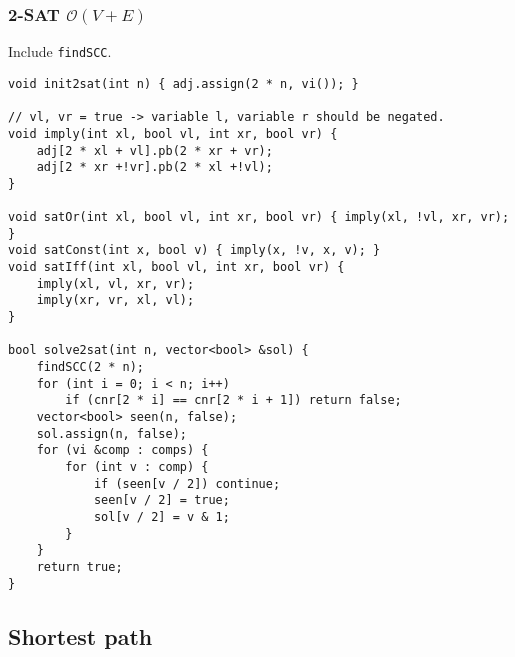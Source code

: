 \documentclass{article}
\begin{document}
\subsubsection{2-SAT $\mathcal{O}(V+E)$}

Include \texttt{findSCC}.

\begin{lstlisting}
void init2sat(int n) { adj.assign(2 * n, vi()); }

// vl, vr = true -> variable l, variable r should be negated.
void imply(int xl, bool vl, int xr, bool vr) {
	adj[2 * xl + vl].pb(2 * xr + vr);
	adj[2 * xr +!vr].pb(2 * xl +!vl);
}

void satOr(int xl, bool vl, int xr, bool vr) { imply(xl, !vl, xr, vr); }
void satConst(int x, bool v) { imply(x, !v, x, v); }
void satIff(int xl, bool vl, int xr, bool vr) {
	imply(xl, vl, xr, vr);
	imply(xr, vr, xl, vl);
}

bool solve2sat(int n, vector<bool> &sol) {
	findSCC(2 * n);
	for (int i = 0; i < n; i++)
		if (cnr[2 * i] == cnr[2 * i + 1]) return false;
	vector<bool> seen(n, false);
	sol.assign(n, false);
	for (vi &comp : comps) {
		for (int v : comp) {
			if (seen[v / 2]) continue;
			seen[v / 2] = true;
			sol[v / 2] = v & 1;
		}
	}
	return true;
}
\end{lstlisting}

\begin{comment}
\subsection{Cycle Detection $\mathcal{O}(V + E)$}

\begin{lstlisting}
vvi adj; // assumes bidirected graph, adjust accordingly
vector<bool> vis(MAXN, false);
vi par(MAXN, -1);

bool cycle_detection() {
	stack<int> s;
	s.push(0);
	vis[0] = true;
	while(!s.empty()) {
		int cur = s.top();
		s.pop();
		for(int i : adj[cur]) {
			if(vis[i] && par[cur] != i) return true;
			s.push(i);
			par[i] = cur;
			vis[i] = true;
		}
	}
	return false;
} 
\end{lstlisting}
\end{comment}

\subsection{Shortest path}
\end{document}
